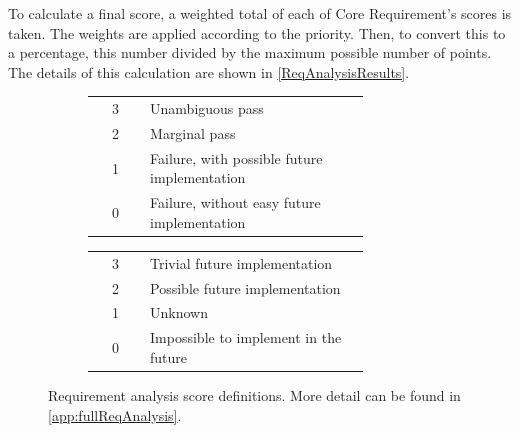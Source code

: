 To calculate a final score, a weighted total of each of Core Requirement's scores is taken. The weights are applied according to the priority. Then, to convert this to a percentage, this number divided by the maximum possible number of points. The details of this calculation are shown in \autoref{ReqAnalysisResults}.

\begin{figure}[H]
  \centering
  \begin{subfigure}[t]{0.5\linewidth}
    \centering
    \begin{tabular}{cp{0.8\linewidth}}\toprule
        3 & Unambiguous pass \\
        2 & Marginal pass \\
        1 & Failure, with possible future implementation \\
        0 & Failure, without easy future implementation
    \\ \bottomrule\end{tabular}
  \end{subfigure}
  \hfill
  \begin{subfigure}[t]{0.45\linewidth}
    \centering
    \begin{tabular}{cp{0.8\linewidth}}\toprule
        3 & Trivial future implementation \\
        2 & Possible future implementation \\
        1 & Unknown \\
        0 & Impossible to implement in the future
    \\ \bottomrule\end{tabular}
  \end{subfigure}
  \caption[Requirement analysis score definitions]{Requirement analysis score definitions. More detail can be found in \autoref{app:fullReqAnalysis}.}
  \label{tab:results/passCriteria}
\end{figure}









